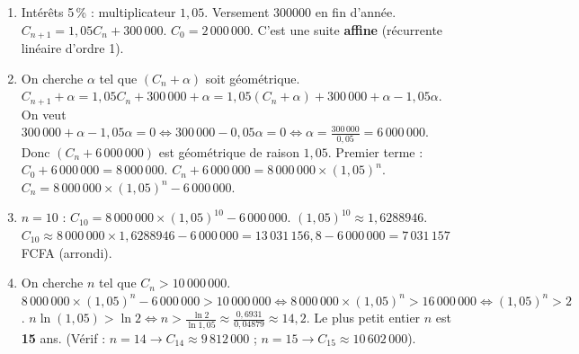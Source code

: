 \documentclass[11pt]{article}
\begin{document}
\begin{corrige}
\begin{enumerate}
    \item Intérêts 5\,\% : multiplicateur $1,05$. Versement \num{300000} en fin d'année.
    $C_{n+1} = 1,05 C_n + 300\,000$.
    $C_0 = 2\,000\,000$.
    C'est une suite \textbf{affine} (récurrente linéaire d'ordre 1).
    \item On cherche $\alpha$ tel que $(C_n + \alpha)$ soit géométrique.
    $C_{n+1} + \alpha = 1,05 C_n + 300\,000 + \alpha = 1,05(C_n + \alpha) + 300\,000 + \alpha - 1,05\alpha$.
    On veut $300\,000 + \alpha - 1,05\alpha = 0 \iff 300\,000 - 0,05\alpha = 0 \iff \alpha = \frac{300\,000}{0,05} = 6\,000\,000$.
    Donc $(C_n + 6\,000\,000)$ est géométrique de raison $1,05$.
    Premier terme : $C_0 + 6\,000\,000 = 8\,000\,000$.
    $C_n + 6\,000\,000 = 8\,000\,000 \times (1,05)^n$.
    $C_n = 8\,000\,000 \times (1,05)^n - 6\,000\,000$.
    \item $n=10$ : $C_{10} = 8\,000\,000 \times (1,05)^{10} - 6\,000\,000$.
    $(1,05)^{10} \approx 1,6288946$.
    $C_{10} \approx 8\,000\,000 \times 1,6288946 - 6\,000\,000 = 13\,031\,156,8 - 6\,000\,000 = 7\,031\,157$ FCFA (arrondi).
    \item On cherche $n$ tel que $C_n > 10\,000\,000$.
    $8\,000\,000 \times (1,05)^n - 6\,000\,000 > 10\,000\,000 \iff 8\,000\,000 \times (1,05)^n > 16\,000\,000 \iff (1,05)^n > 2$.
    $n \ln(1,05) > \ln 2 \iff n > \frac{\ln 2}{\ln 1,05} \approx \frac{0,6931}{0,04879} \approx 14,2$.
    Le plus petit entier $n$ est \textbf{15} ans.
    (Vérif : $n=14 \to C_{14} \approx 9\,812\,000$ ; $n=15 \to C_{15} \approx 10\,602\,000$).
\end{enumerate}
\end{corrige}
\end{document}
